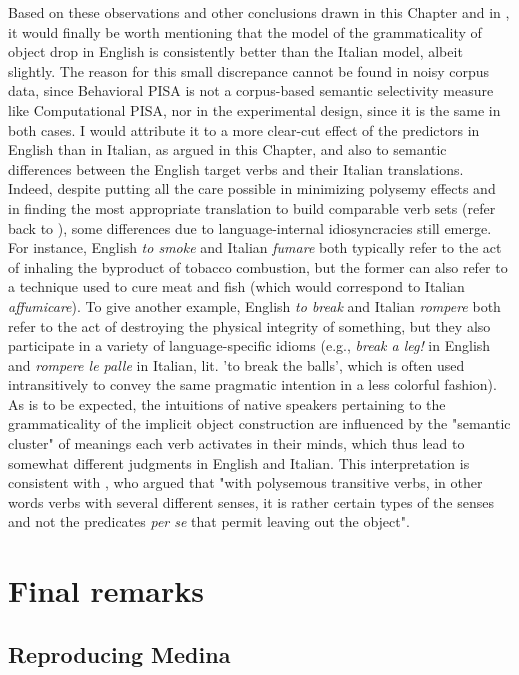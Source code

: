 Based on these observations and other conclusions drawn in this Chapter and in , it would finally be worth mentioning that the model of the grammaticality of object drop in English is consistently better than the Italian model, albeit slightly. The reason for this small discrepance cannot be found in noisy corpus data, since Behavioral PISA is not a corpus-based semantic selectivity measure like Computational PISA, nor in the experimental design, since it is the same in both cases. I would attribute it to a more clear-cut effect of the predictors in English than in Italian, as argued in this Chapter, and also to semantic differences between the English target verbs and their Italian translations. Indeed, despite putting all the care possible in minimizing polysemy effects and in finding the most appropriate translation to build comparable verb sets (refer back to ), some differences due to language-internal idiosyncracies still emerge. For instance, English \textit{to smoke} and Italian \textit{fumare} both typically refer to the act of inhaling the byproduct of tobacco combustion, but the former can also refer to a technique used to cure meat and fish (which would correspond to Italian \textit{affumicare}). To give another example, English \textit{to break} and Italian \textit{rompere} both refer to the act of destroying the physical integrity of something, but they also participate in a variety of language-specific idioms (e.g., \textit{break a leg!} in English and \textit{rompere le palle} in Italian, lit. 'to break the balls', which is often used intransitively to convey the same pragmatic intention in a less colorful fashion). As is to be expected, the intuitions of native speakers pertaining to the grammaticality of the implicit object construction are influenced by the "semantic cluster" of meanings each verb activates in their minds, which thus lead to somewhat different judgments in English and Italian. This interpretation is consistent with \textcite[100]{fillmore1969types}, who argued that "with polysemous transitive verbs, in other words verbs with several different senses, it is rather certain types of the senses and not the predicates \textit{per se} that permit leaving out the object".


\section{Final remarks} 


\subsection{Reproducing Medina} 

